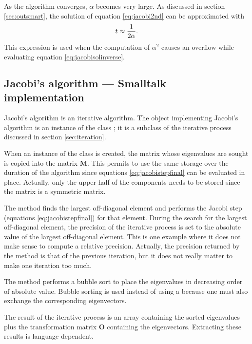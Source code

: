 As the algorithm converges, $\alpha$ becomes very large. As
discussed in section \ref{sec:outsmart}, the solution of equation
\ref{eq:jacobi2nd} can be approximated with
\begin{equation}
  t\approx{\displaystyle 1\over\displaystyle 2\alpha}.
\end{equation}
This expression is used when the computation of $\alpha^2$ causes
an overflow while evaluating equation \ref{eq:jacobisolinverse}.

\subsection{Jacobi's algorithm --- Smalltalk implementation}
Jacobi's algorithm is an iterative algorithm.
The object implementing Jacobi's algorithm is an instance of the class ; it is a subclass of the iterative process discussed in section \ref{sec:iteration}.

When an instance of the class  is created,
the matrix whose eigenvalues are sought is copied into the matrix
$\textbf{M}$.
This permits to use the same storage over the duration of the algorithm since equations \ref{eq:jacobistepfinal} can be evaluated in place.
Actually, only the upper half of the components needs to be stored since the matrix is a symmetric
matrix.

The method  finds the largest off-diagonal
element and performs the Jacobi step (equations
\ref{eq:jacobistepfinal}) for that element. During the search for
the largest off-diagonal element, the precision of the iterative
process is set to the absolute value of the largest off-diagonal
element. This is one example where it does not make sense to
compute a relative precision. Actually, the precision returned by
the method  is that of the previous
iteration, but it does not really matter to make one iteration too
much.

The method  performs a bubble sort to
place the eigenvalues in decreasing order of absolute value.
Bubble sorting is used instead of using a 
because one must also exchange the corresponding eigenvectors.

The result of the iterative process is an array containing the
sorted eigenvalues plus the transformation matrix $\textbf{O}$
containing the eigenvectors. Extracting these results is language
dependent.

